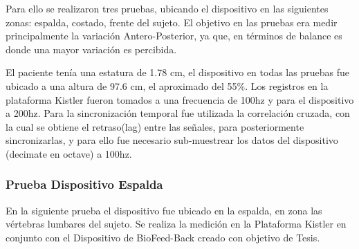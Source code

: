 \documentclass[12pt,a4paper]{article}
\newcommand{\nombreDispositivo}{Dispositivo de BioFeed-Back }
\begin{document}
Para ello se realizaron tres pruebas, ubicando el dispositivo en las siguientes zonas: espalda, costado, frente del sujeto.
El objetivo en las pruebas era medir principalmente la variación Antero-Posterior, ya que, en términos de balance es donde una mayor variación es percibida.

El paciente tenía una estatura de 1.78 cm, el dispositivo en todas las pruebas fue ubicado a una altura de 97.6 cm, el aproximado del 55\%.
Los registros en la plataforma Kistler fueron tomados a una frecuencia de 100hz y para el dispositivo a 200hz. 
Para la sincronización temporal fue utilizada la correlación cruzada, con la cual se obtiene el retraso(lag) entre las señales, para posteriormente sincronizarlas, y para ello fue necesario sub-muestrear los datos del dispositivo (decimate en octave) a 100hz.

\newpage
\subsubsection{Prueba Dispositivo Espalda} En la siguiente prueba el dispositivo fue ubicado en la espalda, en zona las vértebras lumbares del sujeto. Se realiza la medición en la Plataforma Kistler en conjunto con el \nombreDispositivo creado con objetivo de Tesis.
		
\end{document}
